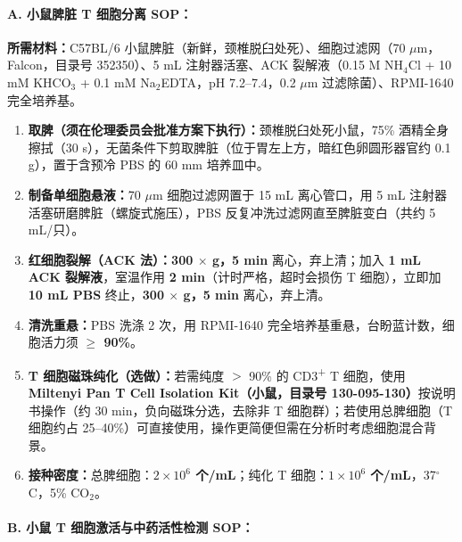 \documentclass[12pt,a4paper,twoside]{article}
\begin{document}
\paragraph{A. 小鼠脾脏 T 细胞分离 SOP：}

\textbf{所需材料：}C57BL/6 小鼠脾脏（新鲜，颈椎脱臼处死）、细胞过滤网（70 $\mu$m，Falcon，目录号 352350）、5 mL 注射器活塞、ACK 裂解液（0.15 M NH$_4$Cl + 10 mM KHCO$_3$ + 0.1 mM Na$_2$EDTA，pH 7.2--7.4，0.2 $\mu$m 过滤除菌）、RPMI-1640 完全培养基。

\begin{enumerate}
  \item \textbf{取脾（须在伦理委员会批准方案下执行）：}颈椎脱臼处死小鼠，75\% 酒精全身擦拭（30 s），无菌条件下剪取脾脏（位于胃左上方，暗红色卵圆形器官约 0.1 g），置于含预冷 PBS 的 60 mm 培养皿中。
  \item \textbf{制备单细胞悬液：}70 $\mu$m 细胞过滤网置于 15 mL 离心管口，用 5 mL 注射器活塞研磨脾脏（螺旋式施压），PBS 反复冲洗过滤网直至脾脏变白（共约 5 mL/只）。
  \item \textbf{红细胞裂解（ACK 法）：}\textbf{300 $\times$ g，5 min} 离心，弃上清；加入 \textbf{1 mL ACK 裂解液}，室温作用 \textbf{2 min}（计时严格，超时会损伤 T 细胞），立即加 \textbf{10 mL PBS} 终止，\textbf{300 $\times$ g，5 min} 离心，弃上清。
  \item \textbf{清洗重悬：}PBS 洗涤 2 次，用 RPMI-1640 完全培养基重悬，台盼蓝计数，细胞活力须 \textbf{$\geq$ 90\%}。
  \item \textbf{T 细胞磁珠纯化（选做）：}若需纯度 $>$ 90\% 的 CD3\textsuperscript{+} T 细胞，使用 \textbf{Miltenyi Pan T Cell Isolation Kit（小鼠，目录号 130-095-130）}按说明书操作（约 30 min，负向磁珠分选，去除非 T 细胞群）；若使用总脾细胞（T 细胞约占 25--40\%）可直接使用，操作更简便但需在分析时考虑细胞混合背景。
  \item \textbf{接种密度：}总脾细胞：\textbf{$2 \times 10^6$ 个/mL}；纯化 T 细胞：\textbf{$1 \times 10^6$ 个/mL}，37$^{\circ}$C，5\% CO$_2$。
\end{enumerate}

\paragraph{B. 小鼠 T 细胞激活与中药活性检测 SOP：}
\end{document}
